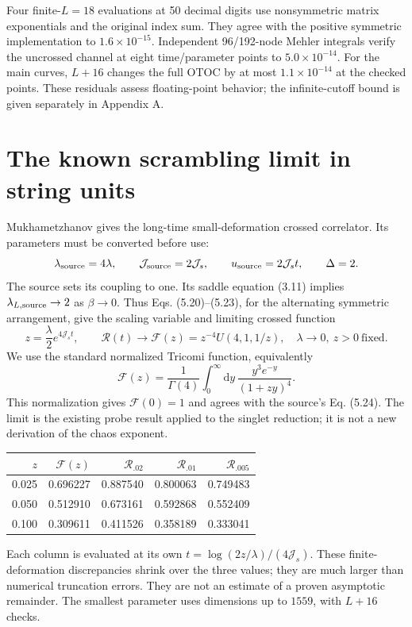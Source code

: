 \documentclass[11pt,a4paper]{article}
\newcommand{\Js}{\mathcal J_s}
\newcommand{\dd}{\mathrm d}
\begin{document}
Four finite-$L=18$ evaluations at 50 decimal digits use nonsymmetric
matrix exponentials and the original index sum. They agree with the
positive symmetric implementation to $1.6\times10^{-15}$.
Independent 96/192-node Mehler integrals verify the uncrossed channel
at eight time/parameter points to $5.0\times10^{-14}$. For the main
curves, $L+16$ changes the full OTOC by at most $1.1\times10^{-14}$
at the checked points. These residuals assess floating-point behavior;
the infinite-cutoff bound is given separately in Appendix A.

\newpage
\section{The known scrambling limit in string units}
Mukhametzhanov \cite{mukh} gives the long-time small-deformation
crossed correlator. Its parameters must be converted before use:
\begin{equation}
 \lambda_{\rm source}=4\lambda,\qquad
 \mathcal J_{\rm source}=2\Js,\qquad
 u_{\rm source}=2\Js t,\qquad \Delta=2.
\end{equation}
The source sets its coupling to one. Its saddle equation (3.11)
implies $\lambda_{L,\rm source}\to2$ as $\beta\to0$.
Thus Eqs. (5.20)--(5.23), for the alternating symmetric arrangement,
give the scaling variable and limiting crossed function
\begin{equation}\boxed{
 z=\frac{\lambda}{2}e^{4\Js t},\qquad
 \mathcal R(t)\longrightarrow\mathcal F(z)
 =z^{-4}U(4,1,1/z),\quad \lambda\to0,\ z>0\ \text{fixed}.}\label{scaling}
\end{equation}
We use the standard normalized Tricomi function, equivalently
\begin{equation}
 \mathcal F(z)=\frac1{\Gamma(4)}
 \int_0^\infty\!\dd y\,\frac{y^3e^{-y}}{(1+zy)^4}.
\end{equation}
This normalization gives $\mathcal F(0)=1$ and agrees with the source's
Eq. (5.24). The limit is the existing probe result applied to the
singlet reduction; it is not a new derivation of the chaos exponent.

\begin{center}
\begin{tabular}{rrrrr}
\toprule
$z$ & $\mathcal F(z)$ & $\mathcal R_{.02}$ & $\mathcal R_{.01}$ & $\mathcal R_{.005}$\\
\midrule
0.025&0.696227&0.887540&0.800063&0.749483\\
0.050&0.512910&0.673161&0.592868&0.552409\\
0.100&0.309611&0.411526&0.358189&0.333041\\
\bottomrule
\end{tabular}
\end{center}
Each column is evaluated at its own $t=\log(2z/\lambda)/(4\Js)$.
These finite-deformation discrepancies shrink over the three values;
they are much larger than numerical truncation errors. They are not
an estimate of a proven asymptotic remainder. The smallest parameter
uses dimensions up to $1559$, with $L+16$ checks.
\end{document}
